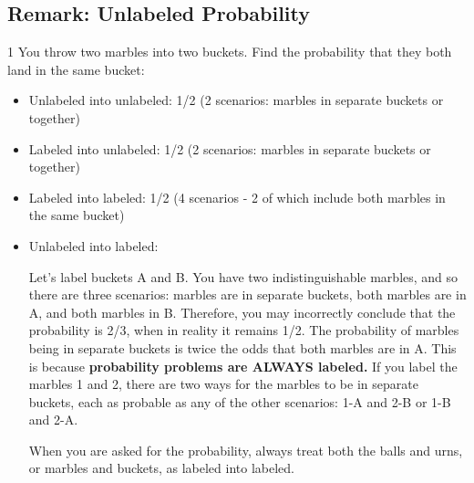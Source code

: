 \subsection{Remark: Unlabeled Probability}

\begin{problem}
1 You throw two marbles into two buckets. Find the probability that they both land in the same bucket: 

\begin{itemize}
    \item Unlabeled into unlabeled:  1/2 (2 scenarios: marbles in separate buckets or together)
    \item Labeled into unlabeled: 1/2 (2 scenarios: marbles in separate buckets or together)
    \item Labeled into labeled: 1/2 (4 scenarios - 2 of which include both marbles in the same bucket)
    
    \item Unlabeled into labeled: 
    
    Let's label buckets A and B. You have two indistinguishable marbles, and so there are three scenarios: marbles are in separate buckets, both marbles are in A, and both marbles in B. Therefore, you may incorrectly conclude that the probability is 2/3, when in reality it remains 1/2. The probability of marbles being in separate buckets is twice the odds that both marbles are in A. 
    \newline \newline
    This is because \textbf{probability problems are ALWAYS labeled.}
    \newline \newline
    If you label the marbles 1 and 2, there are two ways for the marbles to be in separate buckets, each as probable as any of the other scenarios: 1-A and 2-B or 1-B and 2-A. 
    
    When you are asked for the probability, always treat both the balls and urns, or marbles and buckets, as labeled into labeled. 

\end{itemize}

\end{problem}
